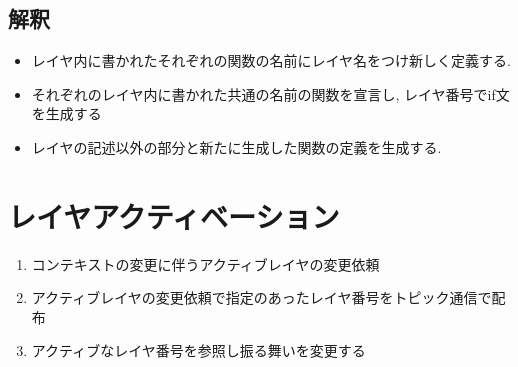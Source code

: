 \subsection{解釈}
\begin{itemize}
 \item レイヤ内に書かれたそれぞれの関数の名前にレイヤ名をつけ新しく定義する.
 \item それぞれのレイヤ内に書かれた共通の名前の関数を宣言し, レイヤ番号でif文を生成する
 \item レイヤの記述以外の部分と新たに生成した関数の定義を生成する.
\end{itemize}

\section{レイヤアクティベーション}

\begin{enumerate}
 \item コンテキストの変更に伴うアクティブレイヤの変更依頼
 \item アクティブレイヤの変更依頼で指定のあったレイヤ番号をトピック通信で配布
 \item アクティブなレイヤ番号を参照し振る舞いを変更する
\end{enumerate}












